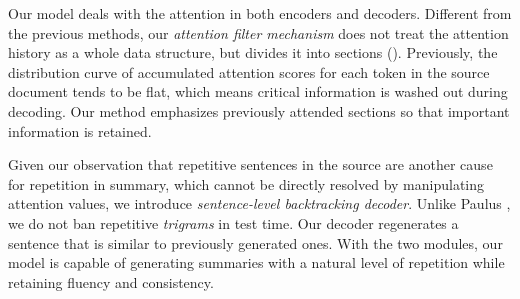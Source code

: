 Our model deals with the attention in both encoders and decoders. 
Different from the previous methods, 
our \textit{attention filter mechanism} does not 
treat the attention history as a whole data structure,  
but divides it into sections (). 
Previously, the distribution curve of accumulated attention scores 
for each token in the source document tends to be flat, 
which means critical information is washed out during decoding.
Our method emphasizes previously attended sections 
so that important information is retained.

Given our observation that repetitive sentences in the source are
another cause for repetition in summary, 
which cannot be directly resolved by manipulating attention values, 
we introduce \textit{sentence-level backtracking decoder}. 
Unlike Paulus , 
we do not ban repetitive \textit{trigrams} in test time. 
Our decoder regenerates a sentence that is similar to previously generated ones.
With the two modules, our model is capable of generating summaries with a
natural level of repetition while retaining fluency and consistency.

